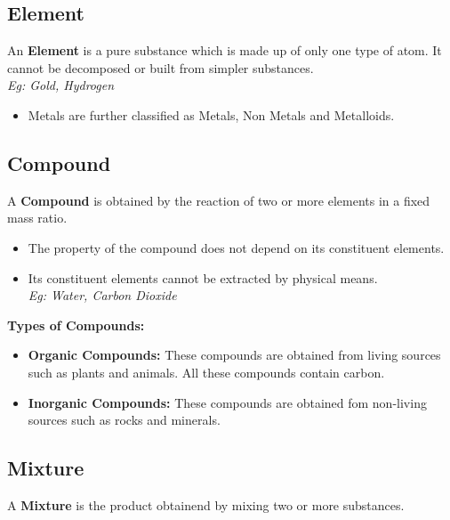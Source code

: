 \documentclass[
  14pt,
]{extarticle}
\providecommand{\tightlist}{%
  \setlength{\itemsep}{0pt}\setlength{\parskip}{0pt}}
\begin{document}
\hypertarget{element}{%
\subsection{Element}\label{element}}

An \textbf{Element} is a pure substance which is made up of only one
type of atom. It cannot be decomposed or built from simpler
substances.\\
\emph{Eg: Gold, Hydrogen}

\begin{itemize}
\tightlist
\item
  Metals are further classified as Metals, Non Metals and Metalloids.
\end{itemize}

\hypertarget{compound}{%
\subsection{Compound}\label{compound}}

A \textbf{Compound} is obtained by the reaction of two or more elements
in a fixed mass ratio.

\begin{itemize}
\tightlist
\item
  The property of the compound does not depend on its constituent
  elements.
\item
  Its constituent elements cannot be extracted by physical means.\\
  \emph{Eg: Water, Carbon Dioxide}
\end{itemize}

\textbf{Types of Compounds:}

\begin{itemize}
\tightlist
\item
  \textbf{Organic Compounds:} These compounds are obtained from living
  sources such as plants and animals. All these compounds contain
  carbon.
\item
  \textbf{Inorganic Compounds:} These compounds are obtained fom
  non-living sources such as rocks and minerals.
\end{itemize}

\hypertarget{mixture}{%
\subsection{Mixture}\label{mixture}}

A \textbf{Mixture} is the product obtainend by mixing two or more
substances.
\end{document}
